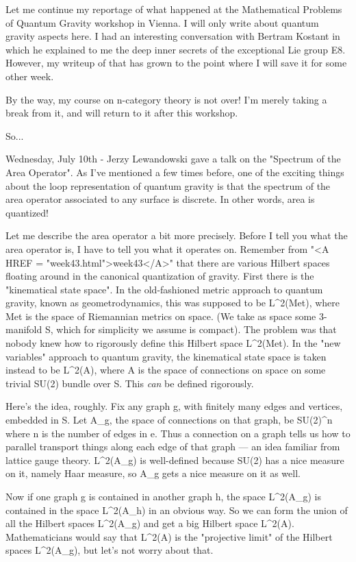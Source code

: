 

Let me continue my reportage of what happened at the Mathematical
Problems of Quantum Gravity workshop in Vienna.  I will only write
about quantum gravity aspects here.  I had an interesting conversation
with Bertram Kostant in which he explained to me the deep inner
secrets of the exceptional Lie group E8.  However, my writeup of that
has grown to the point where I will save it for some other week.

By the way, my course on n-category theory is not over!  I'm merely
taking a break from it, and will return to it after this workshop.

So...

Wednesday, July 10th - Jerzy Lewandowski gave a talk on the "Spectrum
of the Area Operator".  As I've mentioned a few times before, one of
the exciting things about the loop representation of quantum gravity
is that the spectrum of the area operator associated to any surface is
discrete.  In other words, area is quantized! 

Let me describe the area operator a bit more precisely.  Before I tell
you what the area operator is, I have to tell you what it operates on.
Remember from "<A HREF = "week43.html">week43</A>" that there are various Hilbert spaces floating
around in the canonical quantization of gravity.  First there is the
"kinematical state space".  In the old-fashioned metric approach to
quantum gravity, known as geometrodynamics, this was supposed to be
L^2(Met), where Met is the space of Riemannian metrics on space.  (We
take as space some 3-manifold S, which for simplicity we assume is
compact).  The problem was that nobody knew how to rigorously define
this Hilbert space L^2(Met).  In the "new variables" approach to quantum
gravity, the kinematical state space is taken instead to be L^2(A),
where A is the space of connections on space on some trivial SU(2)
bundle over S.  This \emph{can} be defined rigorously.

Here's the idea, roughly.  Fix any graph g, with finitely many edges
and vertices, embedded in S.   Let A_g, the space of connections
on that graph, be SU(2)^n where n is the number of edges in e.  Thus
a connection on a graph tells us how to parallel transport things along
each edge of that graph --- an idea familiar from lattice gauge theory.
L^2(A_g) is well-defined because SU(2) has a nice measure on it, namely
Haar measure, so A_g gets a nice measure on it as well.  

Now if one graph g is contained in another graph h, the space L^2(A_g)
is contained in the space L^2(A_h) in an obvious way.  So we can form
the union of all the Hilbert spaces L^2(A_g) and get a big Hilbert
space L^2(A).  Mathematicians would say that L^2(A) is the "projective
limit" of the Hilbert spaces L^2(A_g), but let's not worry about that.


